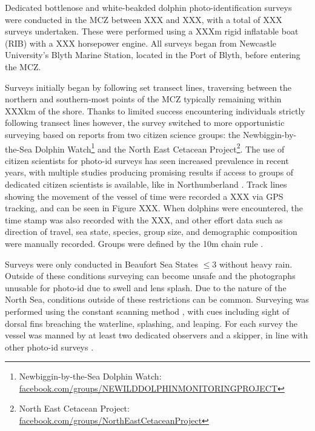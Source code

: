 Dedicated bottlenose and white-beakded dolphin photo-identification surveys were conducted in the MCZ between XXX and XXX, with a total of XXX surveys undertaken. These were performed using a XXXm rigid inflatable boat (RIB) with a XXX horsepower engine. All surveys began from Newcastle University's Blyth Marine Station, located in the Port of Blyth, before entering the MCZ. 

Surveys initially began by following set transect lines, traversing between the northern and southern-most points of the MCZ typically remaining within XXXkm of the shore. Thanks to limited success encountering individuals strictly following transect lines however, the survey switched to more opportunistic surveying based on reports from two citizen science groups: the Newbiggin-by-the-Sea Dolphin Watch\footnote{Newbiggin-by-the-Sea Dolphin Watch: \href{https://en-gb.facebook.com/groups/NEWILDDOLPHINMONITORINGPROJECT/}{facebook.com/groups/NEWILDDOLPHINMONITORINGPROJECT}} and the North East Cetacean Project\footnote{North East Cetacean Project: \href{https://en-gb.facebook.com/groups/NorthEastCetaceanProject/about/}{facebook.com/groups/NorthEastCetaceanProject}}. The use of citizen scientists for photo-id surveys has seen increased prevalence in recent years, with multiple studies producing promising results if access to groups of dedicated citizen scientists is available, like in Northumberland \cite{araujo_population_2017, currie_conservation_2018, armstrong_photographic_2019, araujo_photo-id_2019}. Track lines showing the movement of the vessel of time were recorded a XXX via GPS tracking, and can be seen in Figure XXX. When dolphins were encountered, the time stamp was also recorded with the XXX, and other effort data such as direction of travel, sea state, species, group size, and demographic composition were manually recorded. Groups were defined by the 10m chain rule \cite{smolker_sex_1992}.

Surveys were only conducted in Beaufort Sea States $\le 3$ \cite{world_meteorologicial_society_beaufort_1970} without heavy rain. Outside of these conditions surveying can become unsafe and the photographs unusable for photo-id due to swell and lens splash. Due to the nature of the North Sea, conditions outside of these restrictions can be common. Surveying was performed using the constant scanning method \cite{mann_behavioral_1999}, with cues including sight of dorsal fins breaching the waterline, splashing, and leaping. For each survey the vessel was manned by at least two dedicated observers and a skipper, in line with other photo-id surveys \cite{sharpe_indian_2019, bessesen_lacaziosis-like_2014, silva_winter_2012}. 

